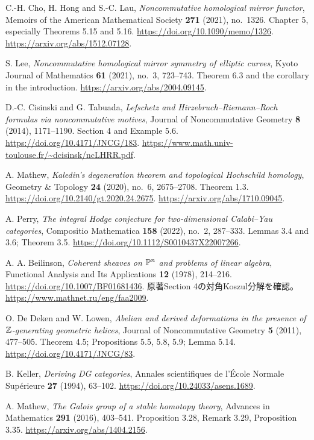 C.-H. Cho, H. Hong and S.-C. Lau,
\emph{Noncommutative homological mirror functor},
Memoirs of the American Mathematical Society \textbf{271} (2021), no.~1326.
Chapter 5, especially Theorems 5.15 and 5.16.
\url{https://doi.org/10.1090/memo/1326}.
\url{https://arxiv.org/abs/1512.07128}.

S. Lee,
\emph{Noncommutative homological mirror symmetry of elliptic curves},
Kyoto Journal of Mathematics \textbf{61} (2021), no.~3, 723--743.
Theorem 6.3 and the corollary in the introduction.
\url{https://arxiv.org/abs/2004.09145}.

D.-C. Cisinski and G. Tabuada,
\emph{Lefschetz and Hirzebruch--Riemann--Roch formulas via noncommutative motives},
Journal of Noncommutative Geometry \textbf{8} (2014), 1171--1190.
Section 4 and Example 5.6.
\url{https://doi.org/10.4171/JNCG/183}.
\url{https://www.math.univ-toulouse.fr/~dcisinsk/ncLHRR.pdf}.

A. Mathew,
\emph{Kaledin's degeneration theorem and topological Hochschild homology},
Geometry \& Topology \textbf{24} (2020), no.~6, 2675--2708.
Theorem 1.3.
\url{https://doi.org/10.2140/gt.2020.24.2675}.
\url{https://arxiv.org/abs/1710.09045}.

A. Perry,
\emph{The integral Hodge conjecture for two-dimensional Calabi--Yau categories},
Compositio Mathematica \textbf{158} (2022), no.~2, 287--333.
Lemmas 3.4 and 3.6; Theorem 3.5.
\url{https://doi.org/10.1112/S0010437X22007266}.

A. A. Beilinson,
\emph{Coherent sheaves on \(\mathbb P^n\) and problems of linear algebra},
Functional Analysis and Its Applications \textbf{12} (1978), 214--216.
\url{https://doi.org/10.1007/BF01681436}.
原著Section 4の対角Koszul分解を確認。
\url{https://www.mathnet.ru/eng/faa2009}.

O. De Deken and W. Lowen,
\emph{Abelian and derived deformations in the presence of \(\mathbb Z\)-generating geometric helices},
Journal of Noncommutative Geometry \textbf{5} (2011), 477--505.
Theorem 4.5; Propositions 5.5, 5.8, 5.9; Lemma 5.14.
\url{https://doi.org/10.4171/JNCG/83}.

B. Keller, \emph{Deriving DG categories},
Annales scientifiques de l'École Normale Supérieure \textbf{27} (1994), 63--102.
\url{https://doi.org/10.24033/asens.1689}.

A. Mathew, \emph{The Galois group of a stable homotopy theory},
Advances in Mathematics \textbf{291} (2016), 403--541.
Proposition 3.28, Remark 3.29, Proposition 3.35.
\url{https://arxiv.org/abs/1404.2156}.

